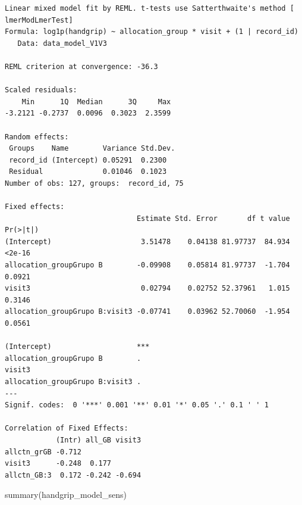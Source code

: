 \documentclass[
  letterpaper,
  DIV=11,
  numbers=noendperiod]{scrartcl}
\newenvironment{Shaded}{\begin{snugshade}}{\end{snugshade}}
\newcommand{\FunctionTok}[1]{\textcolor[rgb]{0.28,0.35,0.67}{#1}}
\newcommand{\NormalTok}[1]{\textcolor[rgb]{0.00,0.23,0.31}{#1}}
\begin{document}
\begin{verbatim}
Linear mixed model fit by REML. t-tests use Satterthwaite's method [
lmerModLmerTest]
Formula: log1p(handgrip) ~ allocation_group * visit + (1 | record_id)
   Data: data_model_V1V3

REML criterion at convergence: -36.3

Scaled residuals: 
    Min      1Q  Median      3Q     Max 
-3.2121 -0.2737  0.0096  0.3023  2.3599 

Random effects:
 Groups    Name        Variance Std.Dev.
 record_id (Intercept) 0.05291  0.2300  
 Residual              0.01046  0.1023  
Number of obs: 127, groups:  record_id, 75

Fixed effects:
                               Estimate Std. Error       df t value Pr(>|t|)
(Intercept)                     3.51478    0.04138 81.97737  84.934   <2e-16
allocation_groupGrupo B        -0.09908    0.05814 81.97737  -1.704   0.0921
visit3                          0.02794    0.02752 52.37961   1.015   0.3146
allocation_groupGrupo B:visit3 -0.07741    0.03962 52.70060  -1.954   0.0561
                                  
(Intercept)                    ***
allocation_groupGrupo B        .  
visit3                            
allocation_groupGrupo B:visit3 .  
---
Signif. codes:  0 '***' 0.001 '**' 0.01 '*' 0.05 '.' 0.1 ' ' 1

Correlation of Fixed Effects:
            (Intr) all_GB visit3
allctn_grGB -0.712              
visit3      -0.248  0.177       
allctn_GB:3  0.172 -0.242 -0.694
\end{verbatim}

\begin{Shaded}
\begin{Highlighting}[]
\FunctionTok{summary}\NormalTok{(handgrip\_model\_sens)}
\end{Highlighting}
\end{Shaded}
\end{document}
